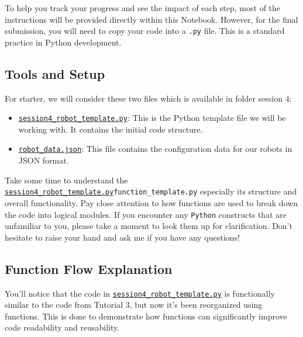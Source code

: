 To help you track your progress and see the impact of each step, most of the instructions will be provided directly within this Notebook. However, for the final submission, you will need to copy your code into a \texttt{.py} file. This is a standard practice in Python development.

\subsection{Tools and Setup}
For starter, we will consider these two files which is available in folder session 4:
\begin{itemize}\setlength{\itemsep}{5pt}
\item \href{https://github.com/balandongiv/computer_programming_gist/blob/main/session4/session4_robot_template.py}{\texttt{session4\_robot\_template.py}}: This is the Python template file we will be working with. It contains the initial code structure.
\item \href{https://github.com/balandongiv/computer_programming_gist/blob/main/session4/robot\_data.json}{\texttt{robot\_data.json}}: This file contains the configuration data for our robots in JSON format.
\end{itemize}

Take some time to understand the \href{https://github.com/balandongiv/computer_programming_gist/blob/main/session4/session4_robot_template.py} {\texttt{session4\_robot\_template.py}}{\texttt{function\_template.py}} especially its structure and overall functionality. Pay close attention to how functions are used to break down the code into logical modules. If you encounter any \texttt{Python} constructs that are unfamiliar to you, please take a moment to look them up for clarification. Don't hesitate to raise your hand and ask me if you have any questions!

\subsection{Function Flow Explanation}
You'll notice that the code in \href{https://github.com/balandongiv/computer_programming_gist/blob/main/session4/session4_robot_template.py}{\texttt{session4\_robot\_template.py}} is functionally similar to the code from Tutorial 3, but now it's been reorganized using functions. This is done to demonstrate how functions can significantly improve code readability and reusability.

